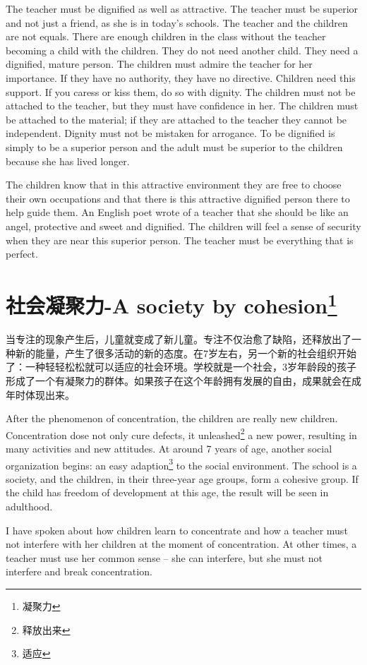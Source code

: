 \documentclass[lang=cn,10pt]{elegantbook}
\begin{document}
The teacher must be dignified as well as attractive. The teacher
must be superior and not just a friend, as she is in today’s schools.
The teacher and the children are not equals. There are enough
children in the class without the teacher becoming a child with the
children. They do not need another child. They need a dignified,
mature person. The children must admire the teacher for her
importance. If they have no authority, they have no directive.
Children need this support. If you caress or kiss them, do so with
dignity. The children must not be attached to the teacher, but they
must have confidence in her. The children must be attached to the
material; if they are attached to the teacher they cannot be
independent. Dignity must not be mistaken for arrogance. To be
dignified is simply to be a superior person and the adult must be
superior to the children because she has lived longer.

The children know that in this attractive environment they are
free to choose their own occupations and that there is this attractive
dignified person there to help guide them. An English poet wrote of a
teacher that she should be like an angel, protective and sweet and
dignified. The children will feel a sense of security when they are
near this superior person. The teacher must be everything that is
perfect.

\chapter{社会凝聚力-A society by cohesion\footnote{凝聚力}}

当专注的现象产生后，儿童就变成了新儿童。专注不仅治愈了缺陷，还释放出了一种新的能量，产生了很多活动的新的态度。在7岁左右，另一个新的社会组织开始了：一种轻轻松松就可以适应的社会环境。学校就是一个社会，3岁年龄段的孩子形成了一个有凝聚力的群体。如果孩子在这个年龄拥有发展的自由，成果就会在成年时体现出来。

After the phenomenon of concentration, the children are really new children. Concentration dose not only cure defects, it unleashed\footnote{释放出来} a new power, resulting in many activities and new attitudes. At around 7 years of age, another social organization begins: an easy adaption\footnote{适应} to the social environment. The school is a society, and the children, in their three-year age groups, form a cohesive group. If the child has freedom of development at this age, the result will be seen in adulthood.

I have spoken about how children learn to concentrate and how a teacher must not interfere with her children at the moment of concentration. At other times, a teacher must use her common sense – she can interfere, but she must not interfere and break concentration.
\end{document}
